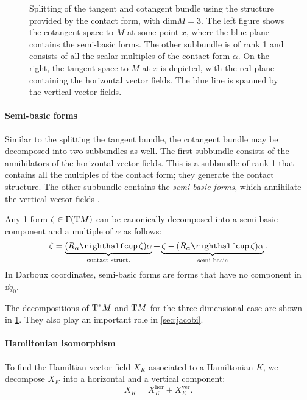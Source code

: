 \begin{figure}[ht!]
    \centering
    
    \caption{Splitting of the tangent and cotangent bundle using the structure provided by the contact form, with $\text{dim} M = 3$. The left figure shows the cotangent space to $M$ at some point $x$, where the blue plane contains the semi-basic forms. The other subbundle is of rank 1 and consists of all the scalar multiples of the contact form $\alpha$. On the right, the tangent space to $M$ at $x$ is depicted, with the red plane containing the horizontal vector fields. The blue line is spanned by the vertical vector fields.}
    \label{fig:contact_spaces}
\end{figure}

\paragraph{Semi-basic forms} Similar to the splitting the tangent bundle, the cotangent bundle may be decomposed into two subbundles as well. The first subbundle consists of the annihilators of the horizontal vector fields. This is a subbundle of rank 1 that contains all the multiples of the contact form; they generate the contact structure. The other subbundle contains the \emph{semi-basic forms}, which annihilate the vertical vector fields \cite{Libermann1987}.

Any 1-form $\zeta \in \mathrm{\Gamma}\qty(\mathrm{T}M)$ can be canonically decomposed into a semi-basic component and a multiple of $\alpha$ as follows:
\begin{equation}
    \zeta = \underbrace{(\intpr{R_\alpha}{\zeta})\alpha}_\text{contact struct.} + \underbrace{\zeta - (\intpr{R_\alpha}{\zeta})\alpha}_\text{semi-basic}. 
    \label{eq:form_splitting}
\end{equation}
In Darboux coordinates, semi-basic forms are forms that have no component in $\dd{q_0}$.

The decompositions of $\mathrm{T}^*M$ and $\mathrm{T}M$ for the three-dimensional case are shown in \cref{fig:contact_spaces}. They also play an important role in \cref{sec:jacobi}.

\paragraph{Hamiltonian isomorphism}
To find the Hamiltian vector field $X_K$ associated to a Hamiltonian $K$, we decompose $X_K$ into a horizontal and a vertical component:
$$ X_K = X_K^\text{hor} + X_K^\text{ver}. $$

